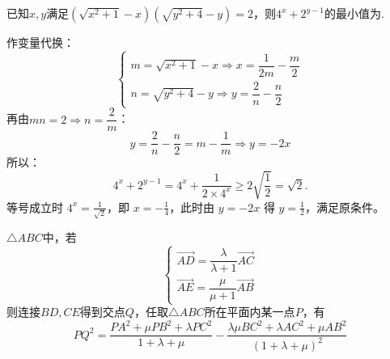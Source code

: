\begin{example}[（南通9调14题）]
    已知$x,y$满足$(\sqrt{x^2+1}-x)(\sqrt{y^2+4}-y)=2$，则$4^{x}+2^{y-1}$的最小值为\underline{\hspace{1cm}}.
\end{example}
\begin{solution}
    作变量代换：\[
    \begin{cases}
        m=\sqrt{x^2+1}-x\Rightarrow x=\dfrac{1}{2m}-\dfrac{m}{2}\\[8pt]
        n=\sqrt{y^2+4}-y\Rightarrow y=\dfrac{2}{n}-\dfrac{n}{2}\end{cases}
    \]
    再由$mn=2\Rightarrow n=\dfrac{2}{m}$：
    \[y=\dfrac{2}{n}-\dfrac{n}{2}=m-\dfrac{1}{m}\Rightarrow y=-2x\]
    所以：
    \[
    4^{x}+2^{y-1}=4^{x}+\dfrac{1}{2\times 4^x}\geq 2\sqrt{\dfrac{1}{2}}=\sqrt2.
    \]
    等号成立时 $4^x=\frac1{\sqrt2}$，即 $x=-\frac14$，此时由 $y=-2x$ 得 $y=\frac12$，满足原条件。
\end{solution}
\newpage
\begin{example}
    \noindent$\triangle{ABC}$中，若
    \[\begin{cases}\overrightarrow{AD}=\dfrac{\lambda}{\lambda+1}\overrightarrow{AC}\\
        \overrightarrow{AE}=\dfrac{\mu}{\mu+1}\overrightarrow{AB}\end{cases}\]
    \noindent 则连接$BD,CE$得到交点$Q$，任取$\triangle{ABC}$所在平面内某一点$P$，有
    \[
    PQ^2=\dfrac{PA^2+\mu PB^2+\lambda PC^2}{1+\lambda+\mu}-\dfrac{\lambda\mu BC^2+\lambda AC^2+\mu AB^2}{\left(1+\lambda+\mu\right)^2}
    \]
\end{example}
